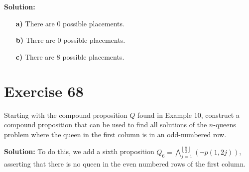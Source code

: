 \documentclass{Axon}
\begin{document}
\noindent
\textbf{Solution:}

\begin{enumerate}
    \item[\textbf{a)}] There are \(0\) possible placements.
    \item[\textbf{b)}] There are \(0\) possible placements.
    \item[\textbf{c)}] There are \(8\) possible placements.
\end{enumerate}

\section*{Exercise 68}
Starting with the compound proposition \(Q\) found in Example 10, construct a compound proposition that can be used to find all solutions of the \(n\)-queens problem where the queen in the first column is in an odd-numbered row.

\noindent
\textbf{Solution:}
To do this, we add a sixth proposition \(Q_6 = \bigwedge_{j = 1}^{\left\lfloor \frac{n}{2}\right\rfloor}(\lnot p (1, 2j))\), asserting that there is no queen in the even numbered rows of the first column.

\printbibliography
\end{document}
